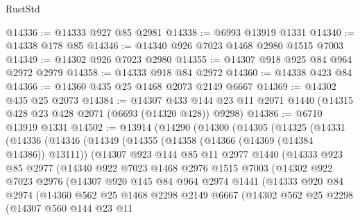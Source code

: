 \begin{lexlean}{RustStd}
\begin{coremodule}
@14336 := @14333 @927 @85 @2981
@14338 := @6993 @13919 @1331
@14340 := @14338 @178 @85
@14346 := @14340 @926 @7023 @1468 @2980 @1515 @7003
@14349 := @14302 @926 @7023 @2980
@14355 := @14307 @918 @925 @84 @964 @2972 @2979
@14358 := @14333 @918 @84 @2972
@14360 := @14338 @423 @84
@14366 := @14360 @435 @25 @1468 @2073 @2149 @6667
@14369 := @14302 @435 @25 @2073
@14384 := @14307
    @433
    @144
    @23
    @11
    @2071
    @1440
    (@14315 @428 @23 @428 @2071 (@6693 (@14320 @428)) @9298)
@14386 := @6710 @13919 @1331
@14502 := @13914
    (@14290
      (@14300
        (@14305
          (@14325
            (@14331
              (@14336
                (@14346
                  (@14349
                    (@14355
                      (@14358 (@14366 (@14369 (@14384 @14386)) @13111))
                      (@14307
                        @923
                        @144
                        @85
                        @11
                        @2977
                        @1440
                        (@14333
                          @923
                          @85
                          @2977
                          (@14340
                            @922
                            @7023
                            @1468
                            @2976
                            @1515
                            @7003
                            (@14302
                              @922
                              @7023
                              @2976
                              (@14307
                                @920
                                @145
                                @84
                                @964
                                @2974
                                @1441
                                (@14333
                                  @920
                                  @84
                                  @2974
                                  (@14360
                                    @562
                                    @25
                                    @1468
                                    @2298
                                    @2149
                                    @6667
                                    (@14302
                                      @562
                                      @25
                                      @2298
                                      (@14307
                                        @560
                                        @144
                                        @23
                                        @11

\end{coremodule}
\end{lexlean}
